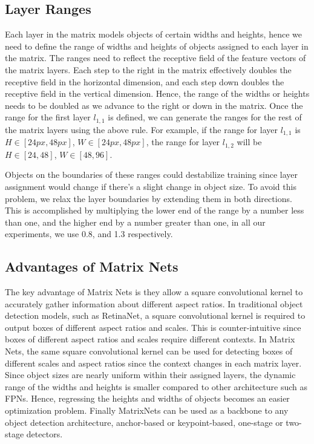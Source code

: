 \documentclass[10pt,twocolumn,letterpaper]{article}
\begin{document}
\subsection{Layer Ranges}
\vspace{-0.25cm}
Each layer in the matrix models objects of certain widths and heights, hence we need to define the range of widths and heights of objects assigned to each layer in the matrix. The ranges need to reflect the receptive field of the feature vectors of the matrix layers. Each step to the right in the matrix effectively doubles the receptive field in the horizontal dimension, and each step down doubles the receptive field in the vertical dimension. Hence, the range of the widths or heights needs to be doubled as we advance to the right or down in the matrix. Once the range for the first layer $l_{1,1}$ is defined, we can generate the ranges for the rest of the matrix layers using the above rule. For example, if the range for layer $l_{1,1}$ is $H\in [24px,48px]$, $W\in [24px,48px]$, the range for layer $l_{1,2}$ will be $H\in [24,48]$, $W\in [48,96]$. 

Objects on the boundaries of these ranges could destabilize training since layer assignment would change if there's a slight change in object size. To avoid this problem, we relax the layer boundaries by extending them in both directions. This is accomplished by multiplying the lower end of the range by a number less than one, and the higher end by a number greater than one, in all our experiments, we use 0.8, and 1.3 respectively.

\subsection{Advantages of Matrix Nets}
The key advantage of Matrix Nets is they allow a square convolutional kernel to accurately gather information about different aspect ratios. In traditional object detection models, such as RetinaNet, a square convolutional kernel is required to output boxes of different aspect ratios and scales. This is counter-intuitive since boxes of different aspect ratios and scales require different contexts. In Matrix Nets, the same square convolutional kernel can be used for detecting boxes of different scales and aspect ratios since the context changes in each matrix layer. Since object sizes are nearly uniform within their assigned layers, the dynamic range of the widths and heights is smaller compared to other architecture such as FPNs. Hence, regressing the heights and widths of objects becomes an easier optimization problem. Finally MatrixNets can be used as a backbone to any object detection architecture, anchor-based or keypoint-based, one-stage or two-stage detectors.
\end{document}
